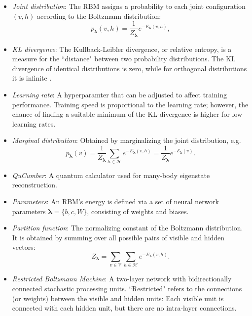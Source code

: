 \documentclass[submission, Phys, hidelinks]{SciPost}
\begin{document}
\begin{itemize}
\item {\it Joint distribution}: The RBM assigns a probability to each joint configuration $(v,h)$ according to the Boltzmann distribution:
\begin{equation}
   p_{\bm{\lambda}}(v,h) = \frac{1}{Z_{\bm{\lambda}}} e^{-E_{\bm{\lambda}}(v,h)},
\end{equation}

\item{\it KL divergence}: The Kullback-Leibler divergence, or relative entropy, is a measure for the ``distance" between two probability distributions. The KL divergence of identical distributions is zero, while for orthogonal distributions it is infinite .

\item{\it Learning rate}: A hyperparamter that can be adjusted to affect training performance. Training speed is proportional to the learning rate; however, the chance of finding a suitable minimum of the KL-divergence is higher for low learning rates.

\item {\it Marginal distribution}: Obtained by marginalizing the joint distribution, e.g.
\begin{equation}\label{Eq:marginal_distribution}
   p_{\bm{\lambda}}(v) = \frac{1}{Z_{\bm{\lambda}}} \sum\limits_{h\in \mathcal{H}} e^{-E_{\bm{\lambda}}(v,h)} = \frac{1}{Z_{\bm{\lambda}}} e^{- \mathcal{E}_{\bm{\lambda}}(v)}.
\end{equation}

\item {\it QuCumber}: A quantum calculator used for many-body eigenstate reconstruction.

\item {\it Parameters}: An RBM's energy is defined via a set of neural network parameters $\bm{\lambda} = \{b,c,W\}$, consisting of weights and biases.

\item {\it Partition function}: The normalizing constant of the Boltzmann distribution. It is obtained by summing over all possible pairs of visible and hidden vectors:
\begin{equation}
   Z_{\bm{\lambda}} = \sum\limits_{v\in \mathcal{V}}\sum\limits_{h\in \mathcal{H}} e^{-E_{\bm{\lambda}}(v,h)}.
\end{equation}

\item {\it Restricted Boltzmann Machine}: A two-layer network with bidirectionally connected stochastic processing units. ``Restricted" refers to the connections (or weights) between the visible and hidden units: Each visible unit is connected with each hidden unit, but there are no intra-layer connections.


\end{itemize}
\end{document}
